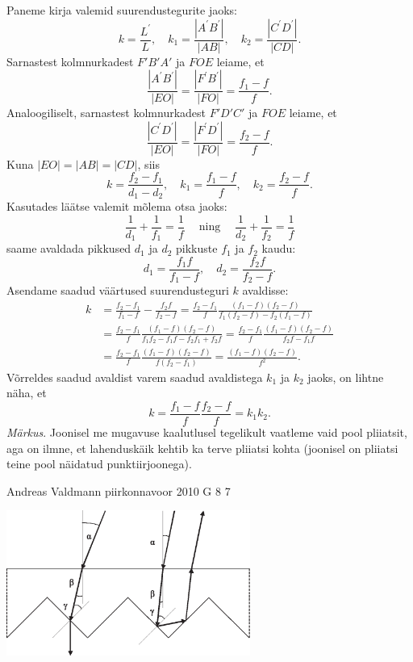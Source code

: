 \documentclass[11pt]{article}
\begin{document}
{{Paneme kirja valemid suurendustegurite jaoks:
\[
k=\frac{L^{\prime}}{L}, \quad k_{1}=\frac{|A^{\prime}B^{\prime}|}{|AB|}, \quad k_{2}=\frac{|C^{\prime}D^{\prime}|}{|CD|}.
\]
Sarnastest kolmnurkadest $F'B'A'$ ja $FOE$ leiame, et
\[
\frac{|A^{\prime}B^{\prime}|}{|EO|}=\frac{|F^{\prime}B^{\prime}|}{|FO|}=\frac{f_{1}-f}{f}.
\]
Analoogiliselt, sarnastest kolmnurkadest $F'D'C'$ ja $FOE$ leiame, et
\[
\frac{|C^{\prime}D^{\prime}|}{|EO|}=\frac{|F^{\prime}D^{\prime}|}{|FO|}=\frac{f_{2}-f}{f}.
\]
Kuna $|EO| = |AB| = |CD|$, siis
\[
k=\frac{f_{2}-f_{1}}{d_{1}-d_{2}}, \quad k_{1}=\frac{f_{1}-f}{f}, \quad k_{2}=\frac{f_{2}-f}{f}.
\]
Kasutades läätse valemit mõlema otsa jaoks:
\[
\frac{1}{d_{1}}+\frac{1}{f_{1}}=\frac{1}{f} \quad \operatorname{ning} \quad \frac{1}{d_{2}}+\frac{1}{f_{2}}=\frac{1}{f}
\]
saame avaldada pikkused $d_1$ ja $d_2$ pikkuste $f_1$ ja $f_2$ kaudu:
\[
d_{1}=\frac{f_{1} f}{f_{1}-f}, \quad d_{2}=\frac{f_{2} f}{f_{2}-f}.
\]
Asendame saadud väärtused suurendusteguri $k$ avaldisse:
\[
\begin{aligned}
	k&=\frac{f_{2}-f_{1}}{f_{1}-f}-\frac{f_{2} f}{f_{2}-f}=\frac{f_{2}-f_{1}}{f} \frac{\left(f_{1}-f\right)\left(f_{2}-f\right)}{f_{1}\left(f_{2}-f\right)-f_{2}\left(f_{1}-f\right)} \\ 
	&=\frac{f_{2}-f_{1}}{f} \frac{\left(f_{1}-f\right)\left(f_{2}-f\right)}{f_{1} f_{2}-f_{1} f-f_{2} f_{1}+f_{2} f}=\frac{f_{2}-f_{1}}{f} \frac{\left(f_{1}-f\right)\left(f_{2}-f\right)}{f_{2} f-f_{1} f} \\ &=\frac{f_{2}-f_{1}}{f} \frac{\left(f_{1}-f\right)\left(f_{2}-f\right)}{f\left(f_{2}-f_{1}\right)}=\frac{\left(f_{1}-f\right)\left(f_{2}-f\right)}{f^{2}}.
\end{aligned}
\]
Võrreldes saadud avaldist varem saadud avaldistega $k_1$ ja $k_2$ jaoks, on lihtne näha, et
\[
k=\frac{f_{1}-f}{f} \frac{f_{2}-f}{f}=k_{1} k_{2}.
\]
\emph{Märkus}. Joonisel me mugavuse kaalutlusel tegelikult vaatleme vaid pool pliiatsit, aga on ilmne, et lahenduskäik kehtib ka terve pliiatsi kohta (joonisel on pliiatsi teine pool näidatud punktiirjoonega).
\fi
}

{Andreas Valdmann} %
{piirkonnavoor} %
{2010} %
{G 8} %
{7} %
{

\ifSolution
\begin{center}
	\includegraphics[width=0.6\textwidth]{2010-v2g-08-hajuti_lah.eps}
\end{center}

}}
\end{document}
